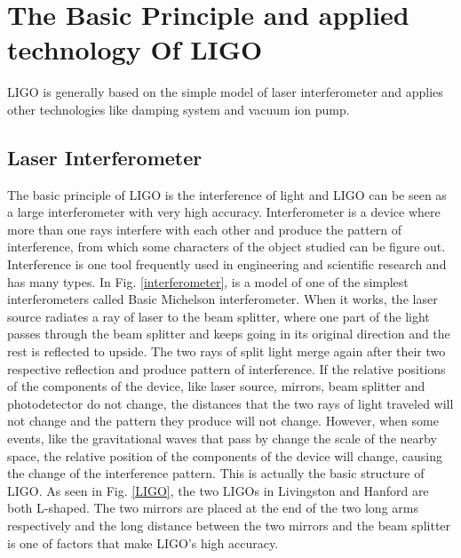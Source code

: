 \documentclass[journal,comsoc,twoside]{IEEEtran}
\begin{document}




\section{The Basic Principle and applied technology Of LIGO}
LIGO is generally based on the simple model of laser interferometer and applies other technologies like damping system and vacuum ion pump.
\subsection{Laser Interferometer}
The basic principle of LIGO is the interference of light and LIGO can be seen as a large interferometer with very high accuracy. Interferometer is a device where more than one rays interfere with each other and produce the pattern of interference, from which some characters of the object studied can be figure out. Interference is one tool frequently used in engineering and scientific research and has many types. In Fig. \ref{interferometer}, is a model of one of the simplest interferometers called Basic Michelson interferometer. When it works, the laser source radiates a ray of laser to the beam splitter, where one part of the light passes through the beam splitter and keeps going in its original direction and the rest is reflected to upside. The two rays of split light merge again after their two respective reflection and produce pattern of interference. If the relative positions of the components of the device, like laser source, mirrors, beam splitter and photodetector do not change, the distances that the two rays of light traveled will not change and the pattern they produce will not change. However, when some events, like the gravitational waves that pass by change the scale of the nearby space, the relative position of the components of the device will change, causing the change of the interference pattern. This is actually the basic structure of LIGO. As seen in Fig. \ref{LIGO}, the two LIGOs in Livingston and Hanford are both L-shaped. The two mirrors are placed at the end of the two long arms respectively and the long distance between the two mirrors and the beam splitter is one of factors that make LIGO's high accuracy.
\end{document}
